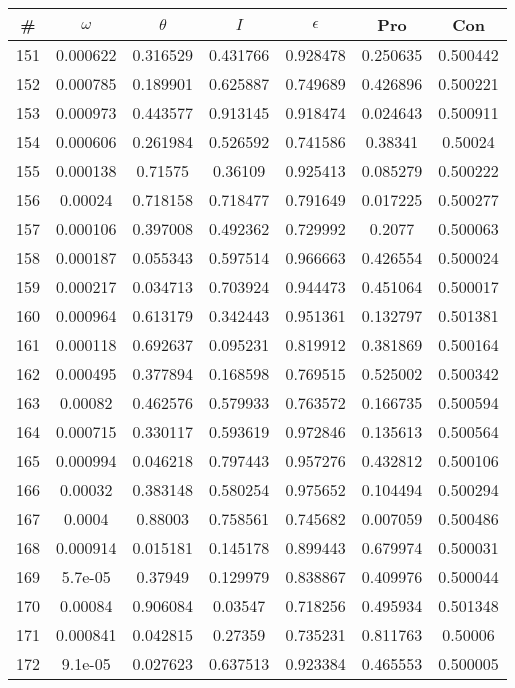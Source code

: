 \newpage
\begin{table}
\begin{tabular}{c|c|c|c|c|c|c}
\# & $\omega$ & $\theta$ & $I$ & $\epsilon$ & Pro & Con\\
\hline
151 & 0.000622 & 0.316529 & 0.431766 & 0.928478 & 0.250635 & 0.500442\\
152 & 0.000785 & 0.189901 & 0.625887 & 0.749689 & 0.426896 & 0.500221\\
153 & 0.000973 & 0.443577 & 0.913145 & 0.918474 & 0.024643 & 0.500911\\
154 & 0.000606 & 0.261984 & 0.526592 & 0.741586 & 0.38341 & 0.50024\\
155 & 0.000138 & 0.71575 & 0.36109 & 0.925413 & 0.085279 & 0.500222\\
156 & 0.00024 & 0.718158 & 0.718477 & 0.791649 & 0.017225 & 0.500277\\
157 & 0.000106 & 0.397008 & 0.492362 & 0.729992 & 0.2077 & 0.500063\\
158 & 0.000187 & 0.055343 & 0.597514 & 0.966663 & 0.426554 & 0.500024\\
159 & 0.000217 & 0.034713 & 0.703924 & 0.944473 & 0.451064 & 0.500017\\
160 & 0.000964 & 0.613179 & 0.342443 & 0.951361 & 0.132797 & 0.501381\\
161 & 0.000118 & 0.692637 & 0.095231 & 0.819912 & 0.381869 & 0.500164\\
162 & 0.000495 & 0.377894 & 0.168598 & 0.769515 & 0.525002 & 0.500342\\
163 & 0.00082 & 0.462576 & 0.579933 & 0.763572 & 0.166735 & 0.500594\\
164 & 0.000715 & 0.330117 & 0.593619 & 0.972846 & 0.135613 & 0.500564\\
165 & 0.000994 & 0.046218 & 0.797443 & 0.957276 & 0.432812 & 0.500106\\
166 & 0.00032 & 0.383148 & 0.580254 & 0.975652 & 0.104494 & 0.500294\\
167 & 0.0004 & 0.88003 & 0.758561 & 0.745682 & 0.007059 & 0.500486\\
168 & 0.000914 & 0.015181 & 0.145178 & 0.899443 & 0.679974 & 0.500031\\
169 & 5.7e-05 & 0.37949 & 0.129979 & 0.838867 & 0.409976 & 0.500044\\
170 & 0.00084 & 0.906084 & 0.03547 & 0.718256 & 0.495934 & 0.501348\\
171 & 0.000841 & 0.042815 & 0.27359 & 0.735231 & 0.811763 & 0.50006\\
172 & 9.1e-05 & 0.027623 & 0.637513 & 0.923384 & 0.465553 & 0.500005\\

\end{tabular}
\end{table}
